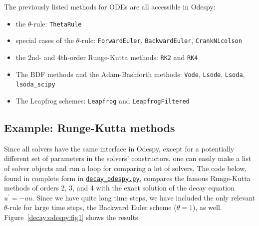 \documentclass[%
oneside,                 %
final,                   %
10pt]{article}
\begin{document}
The previously listed methods for ODEs are all accessible in
Odespy:

\begin{itemize}
 \item the $\theta$-rule: \texttt{ThetaRule}

 \item special cases of the $\theta$-rule: \texttt{ForwardEuler}, \texttt{BackwardEuler},
   \texttt{CrankNicolson}

 \item the 2nd- and 4th-order Runge-Kutta methods: \texttt{RK2} and \texttt{RK4}

 \item The BDF methods and the Adam-Bashforth methods:
   \texttt{Vode}, \texttt{Lsode}, \texttt{Lsoda}, \Verb!lsoda_scipy!

 \item The Leapfrog schemes: \texttt{Leapfrog} and \texttt{LeapfrogFiltered}
\end{itemize}

\noindent
\subsection{Example: Runge-Kutta methods}

Since all solvers have the same interface in Odespy, except for a
potentially different set of
parameters in the solvers' constructors, one can easily make a list of
solver objects and run a loop for comparing a lot of solvers. The
code below, found in complete form in \href{{http://tinyurl.com/ofkw6kc/genz/decay_odespy.py}}{\nolinkurl{decay_odespy.py}},
compares the famous Runge-Kutta methods of orders 2, 3, and 4
with the exact solution of the decay equation
$u^{\prime}=-au$.
Since we have quite long time steps, we have included the only
relevant $\theta$-rule for large time steps, the Backward Euler scheme
($\theta=1$), as well.
Figure~\ref{decay:odespy:fig1} shows the results.
\end{document}
